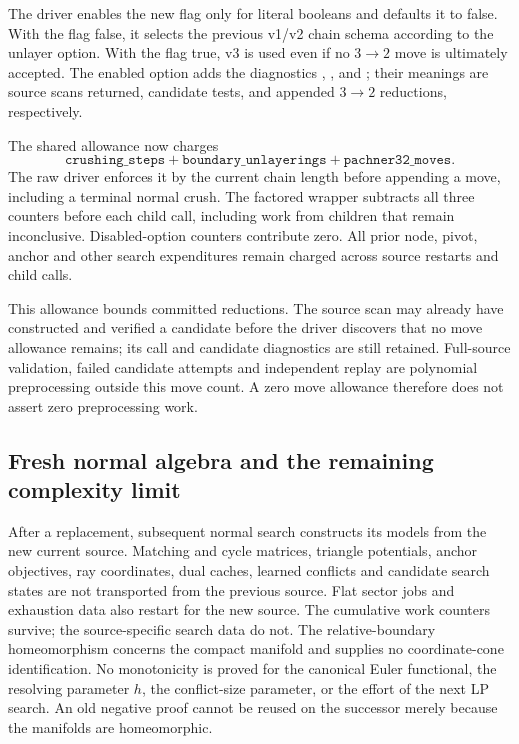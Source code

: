 The driver enables the new flag only for literal booleans and defaults
it to false.  With the flag false, it selects the previous v1/v2 chain
schema according to the unlayer option.  With the flag true, v3 is used
even if no $3\to2$ move is ultimately accepted.  The enabled option adds
the diagnostics , , and
; their meanings are source scans returned,
candidate tests, and appended $3\to2$ reductions, respectively.

The shared  allowance now charges
\[
 \texttt{crushing\_steps}
 +\texttt{boundary\_unlayerings}
 +\texttt{pachner32\_moves}.
\]
The raw driver enforces it by the current chain length before appending
a move, including a terminal normal crush.  The factored wrapper subtracts
all three counters before each child call, including work from children
that remain inconclusive.  Disabled-option counters contribute zero.
All prior node, pivot, anchor and other search expenditures remain
charged across source restarts and child calls.

This allowance bounds committed reductions.  The source scan may already
have constructed and verified a candidate before the driver discovers
that no move allowance remains; its call and candidate diagnostics are
still retained.  Full-source validation, failed candidate attempts and
independent replay are polynomial preprocessing outside this move count.
A zero move allowance therefore does not assert zero preprocessing work.

\subsection{Fresh normal algebra and the remaining complexity limit}

After a replacement, subsequent normal search constructs its models from
the new current source.  Matching and cycle matrices, triangle potentials,
anchor objectives, ray coordinates, dual caches, learned conflicts and
candidate search states are not transported from the previous source.
Flat sector jobs and exhaustion data also restart for the new source.
The cumulative work counters survive; the source-specific search data do
not.  The relative-boundary homeomorphism concerns the compact manifold
and supplies no coordinate-cone identification.  No monotonicity is
proved for the canonical Euler functional, the resolving parameter $h$,
the conflict-size parameter, or the effort of the next LP search.
An old negative proof cannot be reused on the successor merely because
the manifolds are homeomorphic.


